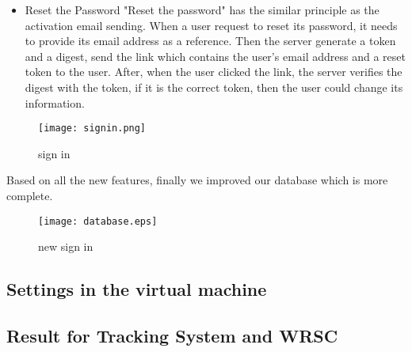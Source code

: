 \begin{enumerate}
\begin{itemize}
\item{Reset the Password}
"Reset the password" has the similar principle as the activation email sending. When a user request to reset its password, it needs to provide its email address as a reference. Then the server generate a token and a digest, send the link which contains the user's email address and a reset token to the user. After, when the user clicked the link, the server verifies the digest with the token, if it is the correct token, then the user could change its information.
\end{itemize}
\begin{figure}[h!]
\centering
\texttt{[image: signin.png]}
\caption{sign in }
\label{fig-sample}
\end{figure}


\end{enumerate}



Based on all the new features, finally we improved our database which is more complete.
\begin{figure}[h!]
\centering
\texttt{[image: database.eps]}
\caption{new sign in }
\label{fig-sample}
\end{figure}
\subsection{Settings in the virtual machine}

\subsection{Result for Tracking System and WRSC}
